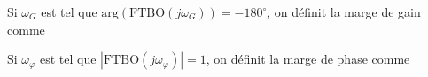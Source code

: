 ﻿\documentclass[a4paper]{article}
\begin{document}
\pagestyle{fancy}
\fancyhf{}
\setlength{\headheight}{15pt}

\begin{center}
	\large{}
\end{center}


Si \( \omega_G \) est tel que \( \mathrm{arg}(\mathrm{FTBO}(j\omega_G)) = -180^\circ \), on définit la marge de gain comme
\begin{center}\end{center}

Si \( \omega_\varphi \) est tel que \( |\mathrm{FTBO}(j\omega_\varphi)| = 1 \), on définit la marge de phase comme
\begin{center}\end{center}
\end{document}
